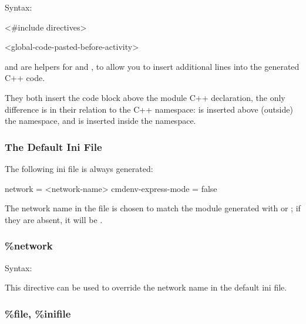 Syntax:

\begin{filelisting}
<#include directives>
\end{filelisting}

\begin{filelisting}
<global-code-pasted-before-activity>
\end{filelisting}

 and  are helpers for 
and , to allow you to insert additional lines into the
generated C++ code.

They both insert the code block above the module C++ declaration, the only
difference is in their relation to the C++ namespace:  is
inserted above (outside) the namespace, and  is inserted
inside the namespace.


\subsubsection{The Default Ini File}
\label{sec:testing:opptest:default-ini-file}

The following ini file is always generated:

\begin{inifile}
[General]
network = <network-name>
cmdenv-express-mode = false
\end{inifile}

The network name in the file is chosen to match the module
generated with  or ; if they
are absent, it will be .

\subsubsection{\%network}
\label{sec:testing:opptest:network}

Syntax:

\begin{filelisting}
\end{filelisting}

This directive can be used to override the network name in the default ini file.


\subsubsection{\%file, \%inifile}
\label{sec:testing:opptest:file-and-inifile}

